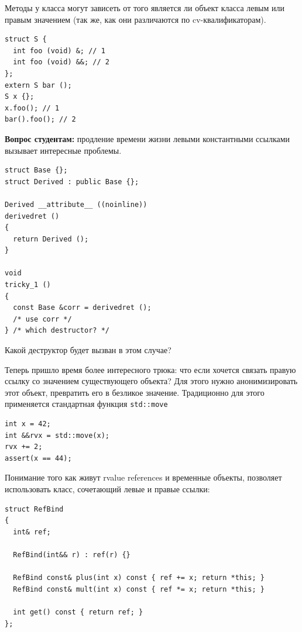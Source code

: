 \documentclass[a4paper,12pt,oneside]{article}
\newif\ifanswers
\begin{document}
Методы у класса могут зависеть от того является ли объект класса левым или правым значением (так же, как они различаются по cv-квалификаторам).

\begin{lstlisting}
struct S {
  int foo (void) &; // 1
  int foo (void) &&; // 2
};
extern S bar ();
S x {};
x.foo(); // 1
bar().foo(); // 2
\end{lstlisting}

\textbf{Вопрос студентам:} продление времени жизни левыми константными ссылками вызывает интересные проблемы.

\begin{lstlisting}
struct Base {};
struct Derived : public Base {};

Derived __attribute__ ((noinline))
derivedret ()
{
  return Derived ();
}

void
tricky_1 ()
{
  const Base &corr = derivedret ();
  /* use corr */
} /* which destructor? */
\end{lstlisting}

Какой деструктор будет вызван в этом случае? 

\ifanswers
Правильный ответ: Оказывается статический тип временного объекта известен компилятору и будет вызван деструктор класса \lstinline!Derived!. То есть ссылки не требуют виртуальных деструкторов для своей диспетчеризации -- компилятор сам может построить верный код удаления.
\fi

Теперь пришло время более интересного трюка: что если хочется связать правую ссылку со значением существующего объекта? Для этого нужно анонимизировать этот объект, превратить его в безликое значение. Традиционно для этого применяется стандартная функция \lstinline!std::move!

\begin{lstlisting}
int x = 42;
int &&rvx = std::move(x);
rvx += 2; 
assert(x == 44);
\end{lstlisting}

Понимание того как живут rvalue references и временные объекты, позволяет использовать класс, сочетающий левые и правые ссылки:

\begin{lstlisting}
struct RefBind
{
  int& ref;

  RefBind(int&& r) : ref(r) {}

  RefBind const& plus(int x) const { ref += x; return *this; }
  RefBind const& mult(int x) const { ref *= x; return *this; }

  int get() const { return ref; }
};
\end{lstlisting}
\end{document}
